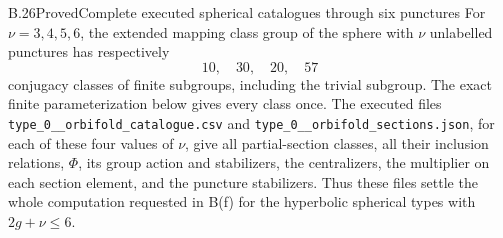 \begin{claim}{B.26}{Proved}{Complete executed spherical catalogues through six punctures}
For $\nu=3,4,5,6$, the extended mapping class group of the sphere with
$\nu$ unlabelled punctures has respectively
\[
                         10,\quad30,\quad20,\quad57
\]
conjugacy classes of finite subgroups, including the trivial subgroup.
The exact finite parameterization below gives every class once.  The
executed files \texttt{type\_0\_\nu\_orbifold\_catalogue.csv} and
\texttt{type\_0\_\nu\_orbifold\_sections.json}, for each of these four
values of $\nu$, give all partial-section classes, all their inclusion
relations, $\Phi$, its group action and stabilizers, the centralizers,
the multiplier on each section element, and the puncture stabilizers.
Thus these files settle the whole computation requested in B(f) for
the hyperbolic spherical types with $2g+\nu\le6$.
\end{claim}
